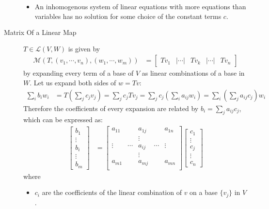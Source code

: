 \documentclass[11pt,notitlepage,oneside]{article}
\begin{document}
\begin{description}
\begin{itemize}
  \item An inhomogenous system of linear equations with more equations than variables has no solution for some choice of the constant terms $c$.
  \end{itemize}
  \item[Matrix Of a Linear Map\label{itm:D6_matrix}]  $T\in\mathcal{L}(V,W)$ is given by \begin{align*}
  \mathcal{M}(T, (v_1,\cdots, v_n), (w_1, \cdots, w_m)) &=\begin{bmatrix}
  Tv_1 &| \cdots |& Tv_k & |\cdots |& Tv_n 
  \end{bmatrix} 
  \end{align*} by expanding every term of a base of $V$ as linear combinations of a base in $W$. Let us expand both sides of $w = Tv$:
  \begin{align*}
  \sum_i b_i w_i &= T\left(\sum_j c_jv_j\right) = \sum_j c_j T v_j = \sum_j c_j \left(\sum_i a_{ij} w_i\right) = \sum_i \left( \sum_j  a_{ij} c_j\right) w_i 
  \end{align*}
  Therefore the coefficients of every expansion are related by $b_i = \sum_j  a_{ij} c_j$, which can be expressed as:
  \begin{align*}
  \begin{bmatrix}
  b_1 \\
  \vdots \\
  b_i \\
  \vdots \\
  b_m
  \end{bmatrix}
  &= \begin{bmatrix}
  a_{11} &       &a_{1j} &        & a_{1n} \\
         &       &\vdots &        &        \\
  \vdots &\cdots &a_{ij} & \cdots &\vdots  \\
         &       &\vdots &        &        \\
  a_{m1} &       &a_{mj} &        &a_{mn}  \\
  \end{bmatrix}
  \begin{bmatrix}
  c_1 \\
  \vdots \\
  c_j \\
  \vdots \\
  c_n
  \end{bmatrix}
  \end{align*} where
  \begin{itemize}
  \item $c_i$ are the coefficients of the linear combination of $v$ on a base $\{v_j\}$ in $V$.

\end{itemize}
\end{description}
\end{document}
